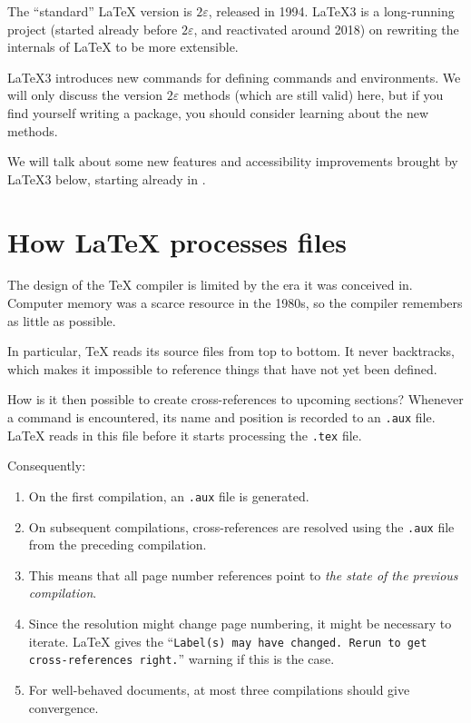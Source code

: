 \begin{latexthree}
The ``standard'' \LaTeX{} version is $2\varepsilon$, released in 1994.
\LaTeX3 is a long-running project (started already before $2\varepsilon$, and reactivated around 2018)
on rewriting the internals of \LaTeX{} to be more extensible.

\LaTeX3 introduces new commands for defining commands and environments.
We will only discuss the version $2\varepsilon$ methods (which are still valid) here,
but if you find yourself writing a package, you should consider learning about the new methods.

We will talk about some new features and accessibility improvements brought by \LaTeX3 below,
starting already in .
\end{latexthree}



%
%
%
\section{How \LaTeX{} processes files}

The design of the \TeX{} compiler is limited by the era it was conceived in.
Computer memory was a scarce resource in the 1980s,
so the compiler remembers as little as possible.

In particular, \TeX{} reads its source files from top to bottom.
It never backtracks,
which makes it impossible to reference things that have not yet been defined.

How is it then possible to create cross-references to upcoming sections?
Whenever a  command is encountered,
its name and position is recorded to an \verb|.aux| file.
\LaTeX{} reads in this file before it starts processing the \verb|.tex| file.

Consequently:
\begin{enumerate}
\item On the first compilation, an \verb|.aux| file is generated.
\item On subsequent compilations, cross-references are resolved
    using the \verb|.aux| file from the preceding compilation.
\item This means that all page number references point to \emph{the state of the previous compilation}.
\item Since the resolution might change page numbering,
    it might be necessary to iterate.
    \LaTeX{} gives the
    ``\texttt{Label(s) may have changed. Rerun to get cross-references right.}''
    warning if this is the case.
\item For well-behaved documents, at most three compilations should give convergence.
\end{enumerate}


